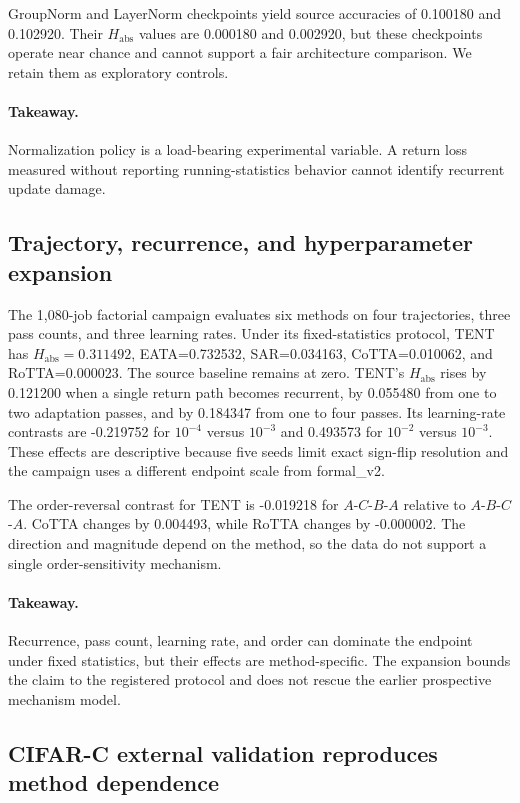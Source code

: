 \documentclass[11pt]{article}
\begin{document}
GroupNorm and LayerNorm checkpoints yield source accuracies of 0.100180 and 0.102920. Their $H_{\mathrm{abs}}$ values are 0.000180 and 0.002920, but these checkpoints operate near chance and cannot support a fair architecture comparison. We retain them as exploratory controls.

\paragraph{Takeaway.}
Normalization policy is a load-bearing experimental variable. A return loss measured without reporting running-statistics behavior cannot identify recurrent update damage.

\subsection{Trajectory, recurrence, and hyperparameter expansion}
\label{sec:trajectory-expansion}

The 1,080-job factorial campaign evaluates six methods on four trajectories, three pass counts, and three learning rates. Under its fixed-statistics protocol, TENT has $H_{\mathrm{abs}}=0.311492$, EATA=0.732532, SAR=0.034163, CoTTA=0.010062, and RoTTA=0.000023. The source baseline remains at zero. TENT's $H_{\mathrm{abs}}$ rises by 0.121200 when a single return path becomes recurrent, by 0.055480 from one to two adaptation passes, and by 0.184347 from one to four passes. Its learning-rate contrasts are -0.219752 for $10^{-4}$ versus $10^{-3}$ and 0.493573 for $10^{-2}$ versus $10^{-3}$. These effects are descriptive because five seeds limit exact sign-flip resolution and the campaign uses a different endpoint scale from formal\_v2.

The order-reversal contrast for TENT is -0.019218 for $A$-$C$-$B$-$A$ relative to $A$-$B$-$C$-$A$. CoTTA changes by 0.004493, while RoTTA changes by -0.000002. The direction and magnitude depend on the method, so the data do not support a single order-sensitivity mechanism.

\paragraph{Takeaway.}
Recurrence, pass count, learning rate, and order can dominate the endpoint under fixed statistics, but their effects are method-specific. The expansion bounds the claim to the registered protocol and does not rescue the earlier prospective mechanism model.

\subsection{CIFAR-C external validation reproduces method dependence}
\label{sec:external-validation}
\end{document}
